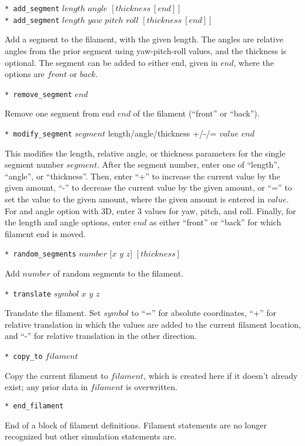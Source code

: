 \documentclass {scrbook}
\newcommand {\ttt} {\texttt}
\begin{document}
\begin{description}
\item{\ttt{* add\_segment} $length$ $angle$ $[thickness\ [end]]$\\
\ttt{* add\_segment} $length$ $yaw$ $pitch$ $roll$ $[thickness\ [end]]$}

Add a segment to the filament, with the given length. The angles are relative angles from the prior segment using yaw-pitch-roll values, and the thickness is optional. The segment can be added to either end, given in $end$, where the options are $front$ or $back$.

\item{\ttt{* remove\_segment} $end$}

Remove one segment from end $end$ of the filament (``front'' or ``back'').

\item{\ttt{* modify\_segment} $segment$ length/angle/thickness +/-/= $value$ $end$}

This modifies the length, relative angle, or thickness parameters for the single segment number $segment$. After the segment number, enter one of ``length'', ``angle'', or ``thickness''. Then, enter ``+'' to increase the current value by the given amount, ``-'' to decrease the current value by the given amount, or ``='' to set the value to the given amount, where the given amount is entered in $value$. For and angle option with 3D, enter 3 values for yaw, pitch, and roll. Finally, for the length and angle options, enter $end$ as either ``front'' or ``back'' for which filament end is moved.

\item{\ttt{* random\_segments} $number$ $[x$ $y$ $z]$ $[thickness]$}

Add $number$ of random segments to the filament.

\item{\ttt{* translate} $symbol$ $x$ $y$ $z$}

Translate the filament. Set $symbol$ to ``='' for absolute coordinates, ``+'' for relative translation in which the values are added to the current filament location, and ``-'' for relative translation in the other direction.

\item{\ttt{* copy\_to} $filament$}

Copy the current filament to $filament$, which is created here if it doesn't already exist; any prior data in $filament$ is overwritten.

\item{\ttt{* end\_filament}}

End of a block of filament definitions. Filament statements are no longer recognized but other simulation statements are.

\end{description}
\end{document}
